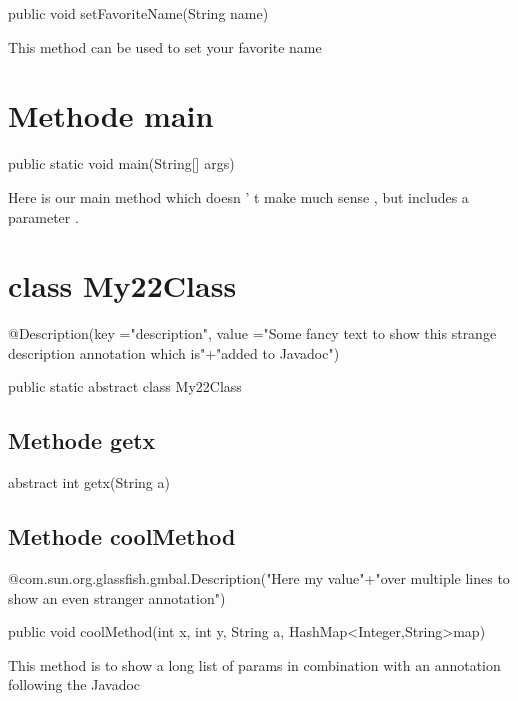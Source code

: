 \documentclass[12pt]{scrreprt}
\begin{document}
public void setFavoriteName(String name)


This method can be used to set your favorite name



\section{Methode main}
\label{examples.SimpleExample:main}




public static void main(String[] args)


Here is our main method which doesn ' t make much sense , but includes a parameter .



\section{class My22Class}
\label{examples.SimpleExample.My22Class}

@Description(key ="description", value ="Some fancy text to show this strange description annotation which is"+"added to Javadoc")



public static abstract class My22Class






\subsection{Methode getx}
\label{examples.SimpleExample.My22Class:getx}




 abstract int getx(String a)






\subsection{Methode coolMethod}
\label{examples.SimpleExample.My22Class:coolMethod}

@com.sun.org.glassfish.gmbal.Description("Here my value"+"over multiple lines to show an even stranger annotation")



public void coolMethod(int x, int y, String a, HashMap\textless Integer,String\textgreater  map)


This method is to show a long list of params in combination with an annotation following the Javadoc
\end{document}
